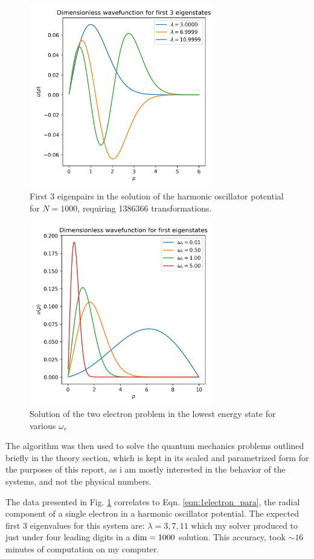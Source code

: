 \documentclass[10pt,showpacs,preprintnumbers,footinbib,amsmath,amssymb,aps,prl,twocolumn,groupedaddress,superscriptaddress,showkeys]{revtex4-1}
\begin{document}
  \begin{figure}[h!]
    \center
    \includegraphics[width=8cm]{figs/question2d1000.png}
    \caption{First 3 eigenpairs in the solution of the harmonic oscillator potential for $N=1000$, requiring 1386366 transformations.}
    \label{fig:1electron}
  \end{figure}
  
  \begin{figure}[h!]
    \center
    \includegraphics[width=8cm]{figs/question2e.png}
    \caption{Solution of the two electron problem in the lowest energy state for various $\omega_r$}
    \label{fig:2electrons}
  \end{figure}

  The algorithm was then used to solve the quantum mechanics problems outlined briefly in the theory section, which is kept in its scaled and parametrized form for the purposes of this report, as i am mostly interested in the behavior of the systems, and not the physical numbers.
  
  The data presented in Fig. \ref{fig:1electron} correlates to Eqn. \ref{eqn:1electron_para}, the radial component of a single electron in a harmonic oscillator potential. The expected first 3 eigenvalues for this system are: $\lambda = 3, 7, 11$ which my solver produced to just under four leading digits in a $\textup{dim}=1000$ solution. This accuracy, took $\sim 16$ minutes of computation on my computer.
\end{document}

